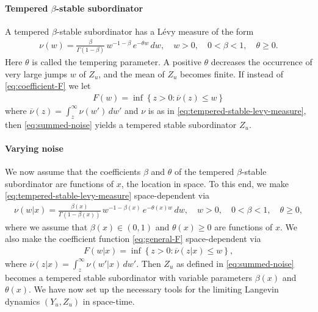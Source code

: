 \documentclass[a4paper,12pt]{elsarticle}
\numberwithin{equation}{section}
\theoremstyle{plain}
\theoremstyle{definition}
\theoremstyle{remark}
\numberwithin{equation}{section}
\newcommand{\1}{\mathbf 1}
\begin{document}
\paragraph{Tempered $\beta$-stable subordinator}
A tempered $\beta$-stable subordinator has a L\'evy measure of the form
\begin{align}
  \label{eq:tempered-stable-levy-measure}
  \nu(w) = \frac{\beta}{\Gamma(1-\beta)}\, w^{-1-\beta}\,e^{-\theta w}\,dw, 
  \quad w > 0, \quad 0 < \beta < 1, \quad \theta \ge 0. 
\end{align}
Here $\theta$ is called the tempering parameter. A positive $\theta$ decreases 
the occurrence of very large jumps $w$ of $Z_u$, and the mean of $Z_u$ becomes 
finite.  If instead of \eqref{eq:coefficient-F} we let 
\begin{align} \label{eq:general-F}
  F(w) = \inf\left\lbrace z > 0: \overline \nu(z) \le w \right\rbrace
\end{align}
where $\overline \nu(z) = \int_z^\infty \nu(w')\,dw'$ and $\nu$ is as in \eqref{eq:tempered-stable-levy-measure}, then 
\eqref{eq:summed-noise}
yields a tempered stable subordinator $Z_u$.

\paragraph{Varying noise}
We now assume that the coefficients $\beta$ and $\theta$ of the tempered 
$\beta$-stable subordinator are functions of $x$, the location in space. 
To this end, we make 
\eqref{eq:tempered-stable-levy-measure} space-dependent via
\begin{align}
  \label{eq:varying-tempered-stable-levy-measure}
  \nu(w | x) = \frac{\beta(x)}{\Gamma(1-\beta(x))}\, 
  w^{-1-\beta(x)}\,e^{-\theta(x) w}\,dw, 
  \quad w > 0, \quad 0 < \beta < 1, \quad \theta \ge 0, 
\end{align}
where we assume that $\beta(x) \in (0,1)$ and $\theta(x) \ge 0$ are  
functions of $x$.
We also make the coefficient function \eqref{eq:general-F} space-dependent via
\begin{align} \label{eq:varying-general-F}
  F(w|x) = \inf\left\lbrace z > 0: \overline \nu(z | x) \le w 
  \right\rbrace,
\end{align}
where $\overline \nu(z | x) = \int_z^\infty \nu(w'|x)\,dw'$.
Then $Z_u$ as defined in \eqref{eq:summed-noise} becomes a tempered stable 
subordinator with variable parameters $\beta(x)$ and $\theta(x)$. 
We have now set up the necessary tools for the limiting Langevin 
dynamics $(Y_u, Z_u)$ in space-time.
\end{document}

